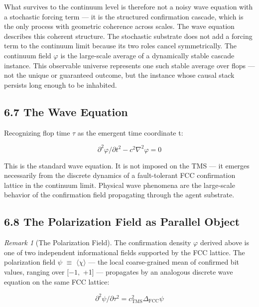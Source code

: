\documentclass[11pt,oneside]{report}
\theoremstyle{definition}
\theoremstyle{remark}
\newtheorem{remark}[theorem]{Remark}
\begin{document}
What survives to the continuum level is therefore not a noisy wave
equation with a stochastic forcing term --- it is the structured
confirmation cascade, which is the only process with geometric coherence
across scales. The wave equation describes this coherent structure. The
stochastic substrate does not add a forcing term to the continuum limit
because its two roles cancel symmetrically. The continuum field \ensuremath{\varphi} is the
large-scale average of a dynamically stable cascade instance. This
observable universe represents one such stable average over flops ---
not the unique or guaranteed outcome, but the instance whose causal
stack persists long enough to be inhabited.

\subsection*{6.7 The Wave Equation}

Recognizing flop time \ensuremath{\tau} as the emergent time coordinate t:

\begin{equation*}
\partial ^{2}\varphi / \partial t^{2} - c^{2}\nabla ^{2}\varphi = 0
\end{equation*}

This is the standard wave equation. It is not imposed on the TMS --- it
emerges necessarily from the discrete dynamics of a fault-tolerant FCC
confirmation lattice in the continuum limit. Physical wave phenomena are
the large-scale behavior of the confirmation field propagating through
the agent substrate.

\subsection*{6.8 The Polarization Field as Parallel Object}

\begin{remark}[The Polarization Field]
The confirmation density \ensuremath{\varphi} derived
above is one of two independent informational fields supported by the
FCC lattice. The polarization field \ensuremath{\psi} \ensuremath{\equiv} \ensuremath{\langle \chi \rangle} --- the local coarse-grained
mean of confirmed bit values, ranging over \ensuremath{[-1,} +1] --- propagates
by an analogous discrete wave equation on the same FCC lattice:
\end{remark}

\begin{equation*}
\partial ^{2}\psi / \partial \tau^{2} = c^{2}_{\mathrm{TMS}} \Delta_{\mathrm{FCC}} \psi
\end{equation*}
\end{document}
